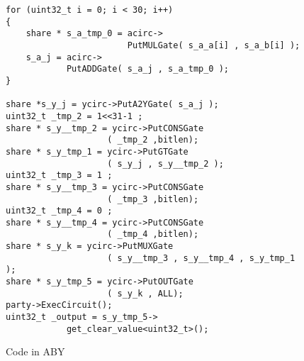 \begin{figure}
\begin{verbatim}
for (uint32_t i = 0; i < 30; i++)
{
    share * s_a_tmp_0 = acirc->
    					PutMULGate( s_a_a[i] , s_a_b[i] );
    s_a_j = acirc->
    		PutADDGate( s_a_j , s_a_tmp_0 );
}

share *s_y_j = ycirc->PutA2YGate( s_a_j );
uint32_t _tmp_2 = 1<<31-1 ;
share * s_y__tmp_2 = ycirc->PutCONSGate
					( _tmp_2 ,bitlen);
share * s_y_tmp_1 = ycirc->PutGTGate
					( s_y_j , s_y__tmp_2 );
uint32_t _tmp_3 = 1 ;
share * s_y__tmp_3 = ycirc->PutCONSGate
					( _tmp_3 ,bitlen);
uint32_t _tmp_4 = 0 ;
share * s_y__tmp_4 = ycirc->PutCONSGate
					( _tmp_4 ,bitlen);
share * s_y_k = ycirc->PutMUXGate
					( s_y__tmp_3 , s_y__tmp_4 , s_y_tmp_1 );
share * s_y_tmp_5 = ycirc->PutOUTGate
					( s_y_k , ALL);
party->ExecCircuit();
uint32_t _output = s_y_tmp_5->
			get_clear_value<uint32_t>();
\end{verbatim}
\caption{Code in ABY}
\label{fig:ex-aby}
\end{figure}